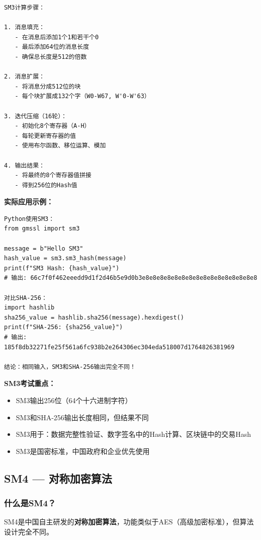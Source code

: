 ﻿\documentclass[12pt,a4paper]{article}
\begin{document}
\begin{lstlisting}
SM3计算步骤：

1. 消息填充：
   - 在消息后添加1个1和若干个0
   - 最后添加64位的消息长度
   - 确保总长度是512的倍数

2. 消息扩展：
   - 将消息分成512位的块
   - 每个块扩展成132个字（W0-W67, W'0-W'63）

3. 迭代压缩（16轮）：
   - 初始化8个寄存器（A-H）
   - 每轮更新寄存器的值
   - 使用布尔函数、移位运算、模加

4. 输出结果：
   - 将最终的8个寄存器值拼接
   - 得到256位的Hash值
\end{lstlisting}

\textbf{实际应用示例：}

\begin{lstlisting}
Python使用SM3：
from gmssl import sm3

message = b"Hello SM3"
hash_value = sm3.sm3_hash(message)
print(f"SM3 Hash: {hash_value}")
# 输出: 66c7f0f462eeedd9d1f2d46b5e9d0b3e8e8e8e8e8e8e8e8e8e8e8e8e8e8e8e8

对比SHA-256：
import hashlib
sha256_value = hashlib.sha256(message).hexdigest()
print(f"SHA-256: {sha256_value}")
# 输出: 185f8db32271fe25f561a6fc938b2e264306ec304eda518007d1764826381969

结论：相同输入，SM3和SHA-256输出完全不同！
\end{lstlisting}

\begin{exambox}
\textbf{SM3考试重点：}
\begin{itemize}
\item SM3输出256位（64个十六进制字符）
\item SM3和SHA-256输出长度相同，但结果不同
\item SM3用于：数据完整性验证、数字签名中的Hash计算、区块链中的交易Hash
\item SM3是国密标准，中国政府和企业优先使用
\end{itemize}
\end{exambox}

\subsection{SM4 — 对称加密算法}

\subsubsection{什么是SM4？}

SM4是中国自主研发的\textbf{对称加密算法}，功能类似于AES（高级加密标准），但算法设计完全不同。
\end{document}
